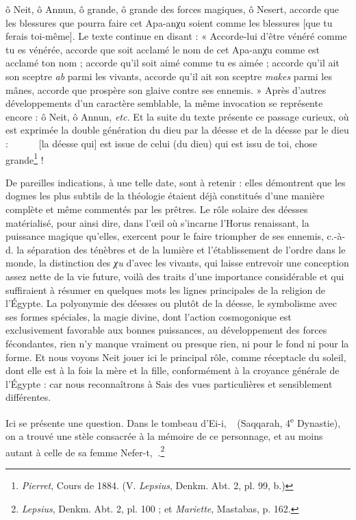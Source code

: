 \documentclass[letterpaper,twocolumn,openany,nodeprecatedcode]{dndbook}
\newcommand*\hieroAAAH{}
\newcommand*\hieroAABR{}
\newcommand*\hieroAADU{}
\newcommand*\hieroAAEN{}
\newcommand*\hieroAAFB{}
\newcommand*\hieroAAFN{\raisebox{0.5ex}{}}
\newcommand*\hieroAALX{\raisebox{0.5ex}{}}
\newcommand*\hieroAASD{}
\newcommand*\hieroAASE{}
\newcommand*\hieroAASF{}
\newcommand*\hieroAASG{}
\begin{document}
ô Neit, ô Annun, ô grande, ô grande des forces magiques, ô Nesert, accorde que les blessures que pourra faire cet Apa-anχu soient comme les blessures [que tu ferais toi-même]. Le texte continue en disant : « Accorde-lui d'être vénéré comme tu es vénérée, accorde que soit acclamé le nom de cet Apa-anχu comme est acclamé ton nom ; accorde qu'il soit aimé comme tu es aimée ; accorde qu'il ait son sceptre \emph{ab} parmi les vivants, accorde qu'il ait son sceptre \emph{makes} parmi les mânes, accorde que prospère son glaive contre ses ennemis. » Après d'autres développements d'un caractère semblable, la même invocation se représente encore : ô Neit, ô Annun, \emph{etc.} Et la suite du texte présente ce passage curieux, où est exprimée la double génération du dieu par la déesse et de la déesse par le dieu : $\hieroAADU\:\hieroAAAH\:\hieroAABR\allowbreak\:\hieroAAFN\:\hieroAADU\:\hieroAASD\allowbreak\:\hieroAAAH\:\hieroAABR\:\hieroAALX\allowbreak\:\hieroAAAH\:\hieroAASE\:\hieroAASF$ [la déesse qui] est issue de celui (du dieu) qui est issu de toi, chose grande\footnote{\emph{Pierret}, Cours de 1884. (V. \emph{Lepsius}, Denkm. Abt. 2, pl. 99, b.)} !

De pareilles indications, à une telle date, sont à retenir : elles démontrent que les dogmes les plus subtils de la théologie étaient déjà constitués d'une manière complète et même commentés par les prêtres. Le rôle solaire des déesses matérialisé, pour ainsi dire, dans l'œil où s'incarne l'Horus renaissant, la puissance magique qu'elles, exercent pour le faire triompher de ses ennemis, c.-à-d. la séparation des ténèbres et de la lumière et l'établissement de l'ordre dans le monde, la distinction des \emph{χu} d'avec les vivants, qui laisse entrevoir une conception assez nette de la vie future, voilà des traits d'une importance considérable et qui suffiraient à résumer en quelques mots les lignes principales de la religion de l'Égypte. La polyonymie des déesses ou plutôt de la déesse, le symbolisme avec ses formes spéciales, la magie divine, dont l'action cosmogonique est exclusivement favorable aux bonnes puissances, au développement des forces fécondantes, rien n'y manque vraiment ou presque rien, ni pour le fond ni pour la forme. Et nous voyons Neit jouer ici le principal rôle, comme réceptacle du soleil, dont elle est à la fois la mère et la fille, conformément à la croyance générale de l'Égypte : car nous reconnaîtrons à Sais des vues particulières et sensiblement différentes.

Ici se présente une question. Dans le tombeau d'Ei-i, $\hieroAAEN\:\hieroAAAH\:\hieroAAAH$ (Saqqarah, 4\textsuperscript{e} Dynastie), on a trouvé une stèle consacrée à la mémoire de ce personnage, et au moins autant à celle de sa femme Nefer-t, $\hieroAAFB\:\hieroAASG$.\footnote{\emph{Lepsius}, Denkm. Abt. 2, pl. 100 ; et \emph{Mariette}, Mastabas, p. 162.}
\end{document}
